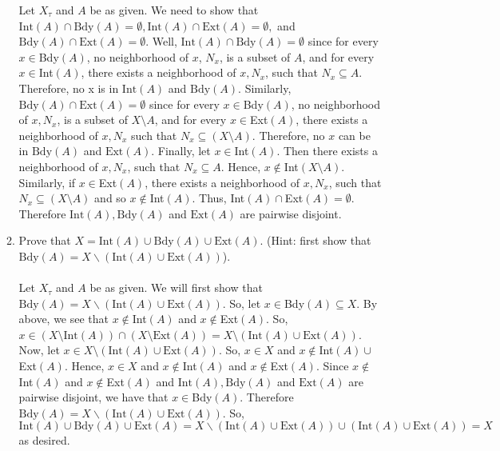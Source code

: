 \documentclass[12pt]{article}
\begin{document}
\begin{enumerate}
\begin{enumerate}
Let $X_{\tau}$ and $A$ be as given. We need to show that $\text{Int}(A)\cap\text{Bdy}(A)=\emptyset, \text{Int}(A)\cap\text{Ext}(A)=\emptyset,$ and $\text{Bdy}(A)\cap\text{Ext}(A)=\emptyset$. Well, $\text{Int}(A)\cap\text{Bdy}(A)=\emptyset$ since for every $x\in$Bdy$(A)$, no neighborhood of $x$, $N_x$, is a subset of $A$, and for every $x\in$Int$(A)$, there exists a neighborhood of $x, N_x$, such that $N_x\subseteq A$. Therefore, no x is in $\text{Int}(A)$ and $\text{Bdy}(A)$. Similarly, $\text{Bdy}(A)\cap\text{Ext}(A)=\emptyset$ since for every $x\in$Bdy$(A)$, no neighborhood of $x, N_x$, is a subset of $X\setminus A$, and for every $x\in$Ext$(A)$, there exists a neighborhood of $x, N_x$ such that $N_x\subseteq(X\setminus A)$. Therefore, no $x$ can be in $\text{Bdy}(A)$ and $\text{Ext}(A)$. Finally, let $x\in$Int$(A)$. Then there exists a neighborhood of $x, N_x$, such that $N_x\subseteq A$. Hence, $x\notin$Int$(X\setminus A)$. Similarly, if $x\in$Ext$(A)$, there exists a neighborhood of $x, N_x$, such that $N_x\subseteq(X\setminus A)$ and so $x\notin$Int$(A)$. Thus, Int$(A)\cap$Ext$(A)=\emptyset$. Therefore $\text{Int}(A), \text{Bdy}(A)$ and $\text{Ext}(A)$ are pairwise disjoint.\\

\item Prove that $X = \text{Int}(A)\cup \text{Bdy}(A) \cup \text{Ext}(A)$. (Hint: first show that $\text{Bdy}(A)=X\backslash (\text{Int}(A)\cup \text{Ext}(A))$).\\\\

Let $X_{\tau}$ and $A$ be as given. We will first show that $\text{Bdy}(A)=X\backslash (\text{Int}(A)\cup \text{Ext}(A))$. So, let $x\in$Bdy$(A)\subseteq X$. By above, we see that $x\notin$Int$(A)$ and $x\notin$Ext$(A)$. So, $x\in(X\setminus\text{Int}(A))\cap(X\setminus\text{Ext}(A))=X\setminus(\text{Int}(A)\cup \text{Ext}(A))$. Now, let $x\in X\setminus(\text{Int}(A)\cup \text{Ext}(A))$. So, $x\in X$ and $x\notin$Int$(A)\cup$Ext$(A)$. Hence, $x\in X$ and $x\notin$Int$(A)$ and $x\notin$Ext$(A)$. Since $x\notin$Int$(A)$ and $x\notin$Ext$(A)$ and $\text{Int}(A), \text{Bdy}(A)$ and $\text{Ext}(A)$ are pairwise disjoint, we have that $x\in$Bdy$(A)$. Therefore $\text{Bdy}(A)=X\backslash (\text{Int}(A)\cup \text{Ext}(A))$. So, $\text{Int}(A)\cup \text{Bdy}(A) \cup \text{Ext}(A)=X\backslash (\text{Int}(A)\cup \text{Ext}(A))\cup(\text{Int}(A)\cup \text{Ext}(A))=X$ as desired.\\

\end{enumerate}


\end{enumerate}
\end{document}
